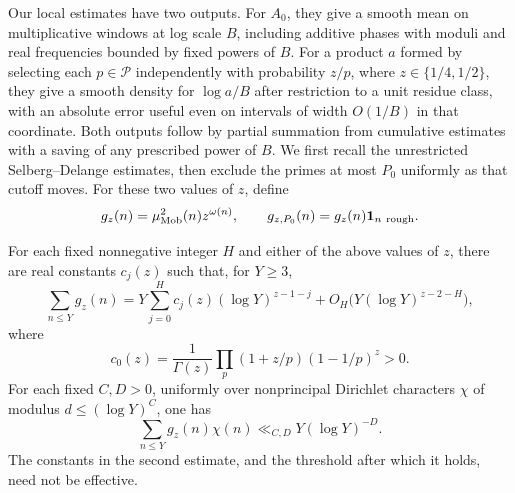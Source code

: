 Our local estimates have two outputs.  For $A_0$, they give a smooth mean
on multiplicative windows at log scale $B$, including additive phases with
moduli and real frequencies bounded by fixed powers of $B$.  For a product $a$
formed by selecting each $p\in\mathcal P$ independently with probability
$z/p$, where $z\in\{1/4,1/2\}$, they give a smooth density for $\log a/B$
after restriction to a unit residue class, with an absolute error useful
even on intervals of width $O(1/B)$ in that coordinate.  Both outputs follow
by partial summation
from cumulative estimates with a saving of any prescribed power of $B$.
We first recall the unrestricted Selberg--Delange estimates, then exclude
the primes at most $P_0$ uniformly as that cutoff moves.
For these two values of $z$, define
\[
 g_z(n)=\mu_{\rm Mob}^2(n)z^{\omega(n)},\qquad
 g_{z,P_0}(n)=g_z(n)\mathbf 1_{n\ {\rm rough}}.
\]

\begin{lemma}
\label{lem:arith-classical-sd}
For each fixed nonnegative integer $H$ and either of the above values of $z$,
there are real constants $c_j(z)$ such that, for $Y\ge3$,
\[
 \sum_{n\le Y}g_z(n)
 =Y\sum_{j=0}^{H}c_j(z)(\log Y)^{z-1-j}
       +O_H\bigl(Y(\log Y)^{z-2-H}\bigr),
\]
where
\[
 c_0(z)=\frac1{\Gamma(z)}
          \prod_p(1+z/p)(1-1/p)^z>0.
\]
For each fixed $C,D>0$, uniformly over nonprincipal Dirichlet characters
$\chi$ of modulus $d\le(\log Y)^C$, one has
\[
 \sum_{n\le Y}g_z(n)\chi(n)\ll_{C,D}Y(\log Y)^{-D}.
\]
The constants in the second estimate, and the threshold after which it
holds, need not be effective.
\end{lemma}

